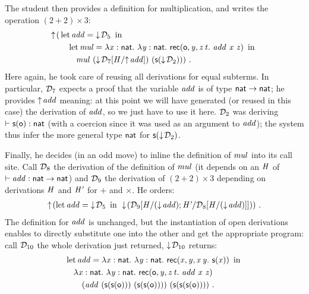 \documentclass[9pt]{sigplanconf}
\begin{document}
The student then provides a definition for multiplication, and writes
the operation $(2 + 2)\times3$:
\begin{align*}
  \finfer{}(
  &\letb{add}{\fget{\md_5}}
  \\
  &\quad\letb{mul} { \tlam x {\cst{nat}} \tlam y
    {\cst{nat}} \recb \z {\var y} z t {
      \app{\var{add}}\app{\var x} {\var z}} }
  \\
  &\quad\quad\app{\var{mul}}\app
  {(\fget{\gsubst{\md_7}{\msubst H {\finfer{\var{add}}}}})}
  {(\s{\fget{\md_2}})}
  )
  \ \text{.}
\end{align*}
Here again, he took care of reusing all derivations for equal
subterms. In particular, $\md_7$ expects a proof that the variable
$\var{add}$ is of type $\cst{nat}\to\cst{nat}$; he provides
$\finfer{\var{add}}$ meaning: at this point we will have generated (or
reused in this case) the derivation of $\var{add}$, so we just have to
use it here. $\md_2$ was deriving $\vdash\s\z:\cst{nat}$ (with a
coercion since it was used as an argument to $\var{add}$); the system
thus infer the more general type $\cst{nat}$ for $\s{\fget{\md_2}}$.

Finally, he decides (in an odd move) to inline the definition of
$\var{mul}$ into its call site. Call $\md_8$ the derivation of the
definition of $\var{mul}$ (it depends on an $\var H$ of
$\vdash\var{add}:\cst{nat}\to\cst{nat}$) and $\md_9$ the derivation of
$(2+2)\times 3$ depending on derivations $\var{H}$ and $\var{H'}$ for $+$ and
$\times$. He orders:
\begin{align*}
\finfer{}(
\letb{add}{\fget{\md_5}}
\fget{({\gsubst{\md_9} {\msubst {H} {(\fget{\var{add}})}; \msubst {H'}
      {\gsubst{\md_8}{\msubst H {(\fget{\var{add}})}}}}})}
)
  \ \text{.}
\end{align*}
The definition for $\var{add}$ is unchanged, but the instantiation of
open derivations enables to directly substitute one into the other and
get the appropriate program: call $\md_{10}$ the whole derivation just
returned, $\fget{\md_{10}}$ returns:
\begin{align*}
  &\letb{add}{\tlam x {\cst{nat}} \tlam y {\cst{nat}} \recb {\var x}
    {\var y} x y {\s{\var x}}}
  \\&\quad
  {\tlam x {\cst{nat}} \tlam y
    {\cst{nat}} \recb \z {\var y} z t {
      \app{\var{add}}\app{\var x} {\var z}}}
  \\&\quad\quad
  \app{(\app {\var{add}} \app {(\s{\s\z})}
    {(\s{\s\z})})}{(\s{\s{\s\z}})}
  \ \text{.}
\end{align*}
\end{document}
